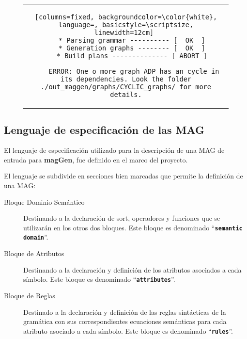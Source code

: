 \documentclass[runningheads,a4paper]{llncs}
\newcommand{\textbtt}[1]{\texttt{\textbf{#1}}}
\newcommand{\maggen}{\textbf{magGen}}
\begin{document}
\begin{figure}[!ht]
\begin{center}
\begin{tabular}{c}
\begin{lstlisting}[columns=fixed, backgroundcolor=\color{white}, language=, basicstyle=\scriptsize, linewidth=12cm] 
   * Parsing grammar ---------- [  OK  ]
   * Generation graphs -------- [  OK  ]
   * Build plans -------------- [ ABORT ]

    ERROR: One o more graph ADP has an cycle in its dependencies. Look the folder ./out_maggen/graphs/CYCLIC_graphs/ for more details.
\end{lstlisting}
\end{tabular}
\end{center}
\vspace{-0.7cm}
\end{figure}

\subsection{Lenguaje de especificación de las MAG}
\label{sec:lenguajeMAG}
\vspace{-0.22cm}
El lenguaje de especificación utilizado para la descripción de una MAG de entrada para \maggen, fue definido en el marco del proyecto.
 
El lenguaje se subdivide en secciones bien marcadas que permite la definición de una MAG:

 

\begin{description}
\item [Bloque Dominio Semántico] Destinando a la declaración de sort, operadores y funciones que se utilizarán en los otros dos bloques. Este bloque es denominado ``\textbtt{semantic domain}''.

\item [Bloque de Atributos] Destinando a la declaración y definición de los atributos asociados a cada símbolo. Este bloque es denominado ``\textbtt{attributes}''.

\item [Bloque de Reglas] Destinado a la declaración y definición de las reglas sintácticas de la gramática con sus correspondientes ecuaciones semánticas para cada atributo asociado a cada símbolo. Este bloque es denominado ``\textbtt{rules}''.
\end{description}
\end{document}

